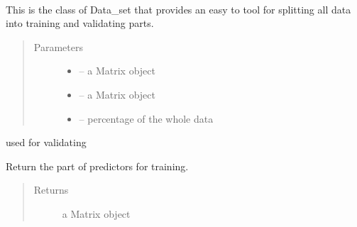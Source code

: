 \documentclass[letterpaper,10pt,english]{sphinxmanual}
\begin{document}
\begin{fulllineitems}
\label{\detokenize{index:dbm_py.interface.Data_set}}~

\begin{fulllineitems}
\label{\detokenize{index:dbm_py.interface.Data_set.__init__}}
This is the class of Data\_set that provides an easy to tool
for splitting all data into training and validating
parts.
\begin{quote}\begin{description}
\item[{Parameters}] \leavevmode\begin{itemize}
\item {} 
 -- a Matrix object

\item {} 
 -- a Matrix object

\item {} 
 -- percentage of the whole data

\end{itemize}

\end{description}\end{quote}

used for validating

\end{fulllineitems}


\begin{fulllineitems}
\label{\detokenize{index:dbm_py.interface.Data_set.get_train_x}}
Return the part of predictors for training.
\begin{quote}\begin{description}
\item[{Returns}] \leavevmode
a Matrix object

\end{description}\end{quote}


\end{fulllineitems}
\end{fulllineitems}
\end{document}
